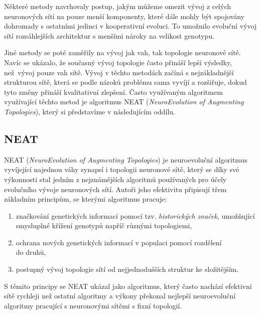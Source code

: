 Některé metody \citet{gomez2008accelerated} navrhovaly postup, jakým můžeme
omezit vývoj z celých neuronových sítí na pouze menší komponenty, které dále
mohly být spojovány dohromady s ostatními jedinci v kooperativní evoluci. To
umožnilo evoluční vývoj sítí rozsáhlejších architektur s menšími nároky na
velikost genotypu.

Jiné metody se poté zaměřily na vývoj jak vah, tak topologie neuronové sítě.
Navíc se ukázalo, že současný vývoj topologie často přináší lepší výsledky,
než~vývoj pouze vah sítě. Vývoj v těchto metodách začíná s nejzákladnější
strukturou sítě, která se podle nároků problému sama vyvíjí a rozšiřuje, dokud
tyto změny přináší kvalitativní zlepšení. Často využívaným algoritmem
využívající těchto metod je algoritmus NEAT (\emph{NeuroEvolution of Augmenting
Topologies}), který si představíme v následujícím oddílu.

\subsection{NEAT} \label{NN - NEAT}
NEAT (\emph{NeuroEvolution of Augmenting Topologies})
\citep{stanley2002evolving} je neuroevoluční algoritmus vyvíjející najednou
váhy synapsí i topologii neuronové sítě, který se díky své výkonnosti stal
jedním z nejznámějších algoritmů používaných pro účely evolučního vývoje
neuronových sítí. Autoři jeho efektivitu připisují třem základním principům, se
kterými algoritmus pracuje:
\begin{enumerate}
    \item značkování genetických informací pomocí tzv. \emph{historických značek},
        umožňující smysluplné křížení genotypů napříč různými topologiemi,
   \item ochrana nových genetických informací v populaci pomocí rozdělení\\
       do druhů,
    \item postupný vývoj topologie sítí od nejjednodušších struktur ke
        složitějším.
\end{enumerate}
S těmito principy se NEAT ukázal jako algoritmus, který často nachází efektivní
sítě rychleji než ostatní algoritmy a výkony překonal nejlepší neuroevoluční
algoritmy pracující s neuronovými sítěmi s fixní topologií.

